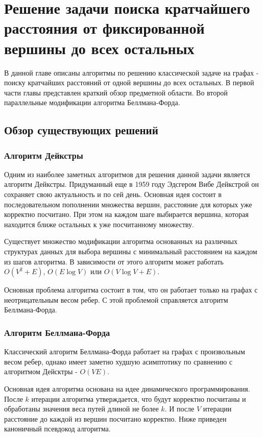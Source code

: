 \chapter{Решение задачи поиска кратчайшего расстояния от фиксированной вершины до всех остальных}
\label{chapSVD}

В данной главе описаны алгоритмы по решению классической задаче на графах - поиску кратчайших расстояний от одной вершины до всех остальных. В первой части главы представлен краткий обзор предметной области. Во второй параллельные модификации алгоритма Беллмана-Форда. 

\FloatBarrier
\section{Обзор существующих решений}
\subsection{Алгоритм Дейкстры}

Одним из наиболее заметных алгоритмов для решения данной задачи является алгоритм Дейкстры. Придуманный еще в 1959 году Эдсгером Вибе Дейкстрой он сохраняет свою актуальность и по сей день. Основная идея состоит в последовательном пополнении множества вершин, расстояние для которых уже корректно посчитано. При этом на каждом шаге выбирается вершина, которая находится ближе остальных к уже посчитанному множеству. 

Существует множество модификации алгоритма основанных на различных структурах данных для выбора вершины с минимальный расстоянием на каждом из шагов алгоритма. В зависимости от этого алгоритм может работать $O(V^2+E)$, $O(E \log V)$ или $O(V \log V+E)$. 

Основная проблема алгоритма состоит в том, что он работает только на графах с неотрицательным весом ребер. С этой проблемой справляется алгоритм Беллмана-Форда. 


\FloatBarrier
\subsection{Алгоритм Беллмана-Форда}

Классический алгоритм Беллмана-Форда работает на графах с произвольным весом ребер, однако имеет заметно худшую асимптотику по сравнению с алгоритмом Дейсктры - $O(VE)$. 

Основная идея алгоритма основана на идее динамического программирования. После $k$ итерации алгоритма утверждается, что будут корректно посчитаны и обработаны значения веса путей длиной не более $k$. И после $V$ итерации расстояние до каждой из вершин посчитано корректно. Ниже приведен каноничный псевдокод алгоритма. 

